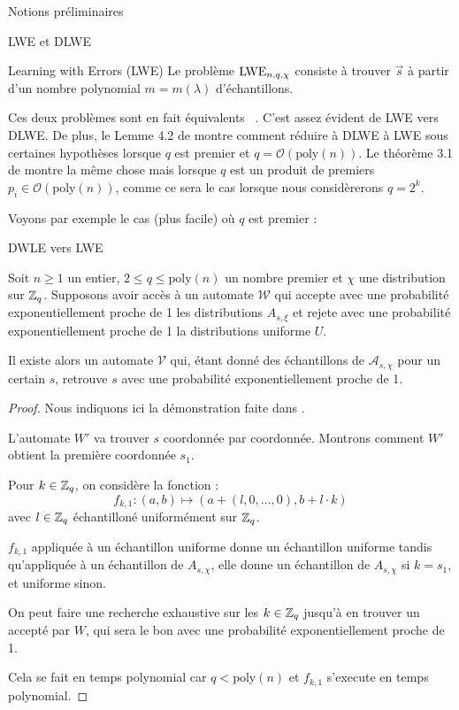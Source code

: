 \begin{section}{Notions préliminaires}
\begin{subsection}{LWE et DLWE}
\begin{definition}{Learning with Errors (LWE)}
	Le problème $\text{LWE}_{n,q,\chi}$ consiste à trouver $\vec{s}$ à partir d'un nombre polynomial $m = m(\lambda)$ d'échantillons.
	\end{definition}

	Ces deux problèmes sont en fait \og équivalents \fg~. C'est assez évident de LWE vers DLWE. De plus, le Lemme 4.2
	de \cite{STOC:Regev05} montre comment réduire à DLWE à LWE sous certaines hypothèses lorsque $q$ est premier et
	$q = \mathcal{O}(\text{poly}(n))$. Le théorème 3.1 de \cite{EPRINT:MicPei11} montre la même chose mais lorsque
	$q$ est un produit de premiers $p_i \in \mathcal{O}(\text{poly}(n))$, comme ce sera le cas lorsque nous
	considèrerons $q = 2^k$.

	Voyons par exemple le cas (plus facile) où $q$ est premier :

	\begin{prop}{DWLE vers LWE}

	Soit $n \geqslant 1$ un entier, $2 \leqslant q \leqslant \text{poly}(n)$ un nombre premier et $\chi$ une
	distribution sur $\mathbb{Z}_q$. Supposons avoir accès à un automate $\mathcal{W}$ qui accepte avec une probabilité
	exponentiellement proche de 1 les distributions $A_{s, \xi}$ et rejete avec une probabilité exponentiellement
	proche de 1 la distributions uniforme $U$.
	
	Il existe alors un automate $\mathcal{V}$ qui, étant donné des échantillons de $\mathcal{A}_{s,\chi}$ pour un
	certain $s$, retrouve $s$ avec une probabilité exponentiellement proche de 1.
	\end{prop}
	\begin{proof}
	Nous indiquons ici la démonstration faite dans \cite{STOC:Regev05}.
	
	L'automate $W'$ va trouver $s$ coordonnée par coordonnée. Montrons comment $W'$ obtient la première coordonnée $s_1$.
	
	Pour $k \in \mathbb{Z}_q$, on considère la fonction :
	\[f_{k,1}: (a,b) \mapsto (a + (l, 0, ..., 0), b + l \cdot k) \]
	avec $l\in \mathbb{Z}_q$ échantilloné uniformément sur $\mathbb{Z}_q$.
	
	$f_{k,1}$ appliquée à un échantillon uniforme donne un échantillon uniforme tandis qu'appliquée à un échantillon
	de $A_{s, \chi}$, elle donne un échantillon de $A_{s, \chi}$ si $k = s_1$, et uniforme sinon.
	
	On peut faire une recherche exhaustive sur les $k \in \mathbb{Z}_q$ jusqu'à en trouver un accepté par $W$, qui sera le
	bon avec une probabilité exponentiellement proche de 1.
	
	Cela se fait en temps polynomial car $q < \text{poly}(n)$ et $f_{k,1}$ s'execute en temps polynomial.
	

\end{proof}
\end{subsection}
\end{section}
